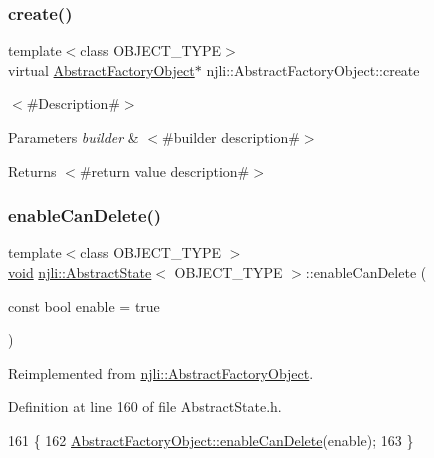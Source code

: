 \subsubsection{\texorpdfstring{create()}{create()}}
{\footnotesize\ttfamily template$<$class O\+B\+J\+E\+C\+T\+\_\+\+T\+Y\+PE$>$ \\
virtual \mbox{\hyperlink{classnjli_1_1_abstract_factory_object}{Abstract\+Factory\+Object}}$\ast$ njli\+::\+Abstract\+Factory\+Object\+::create}

$<$\#\+Description\#$>$


\begin{DoxyParams}{Parameters}
{\em builder} & $<$\#builder description\#$>$\\
\hline
\end{DoxyParams}
\begin{DoxyReturn}{Returns}
$<$\#return value description\#$>$ 
\end{DoxyReturn}
\mbox{\label{classnjli_1_1_abstract_state_a4ed007508bd8f80af668a302376b7d1a}} 
\subsubsection{\texorpdfstring{enable\+Can\+Delete()}{enableCanDelete()}}
{\footnotesize\ttfamily template$<$class O\+B\+J\+E\+C\+T\+\_\+\+T\+Y\+PE $>$ \\
\mbox{\hyperlink{_thread_8h_af1e856da2e658414cb2456cb6f7ebc66}{void}} \mbox{\hyperlink{classnjli_1_1_abstract_state}{njli\+::\+Abstract\+State}}$<$ O\+B\+J\+E\+C\+T\+\_\+\+T\+Y\+PE $>$\+::enable\+Can\+Delete (\begin{DoxyParamCaption}\item[{const bool}]{enable = {\ttfamily true} }\end{DoxyParamCaption})\hspace{0.3cm}{\ttfamily [virtual]}}



Reimplemented from \mbox{\hyperlink{classnjli_1_1_abstract_factory_object_a678b8f28320f6a7e2aa38d5ef72889a8}{njli\+::\+Abstract\+Factory\+Object}}.



Definition at line 160 of file Abstract\+State.\+h.


\begin{DoxyCode}
161   \{
162     \mbox{\hyperlink{classnjli_1_1_abstract_factory_object_a678b8f28320f6a7e2aa38d5ef72889a8}{AbstractFactoryObject::enableCanDelete}}(enable);
163   \}
\end{DoxyCode}
\mbox{\label{classnjli_1_1_abstract_state_aa4e66d0016cd5c43dc3a485eaf558174}} 
